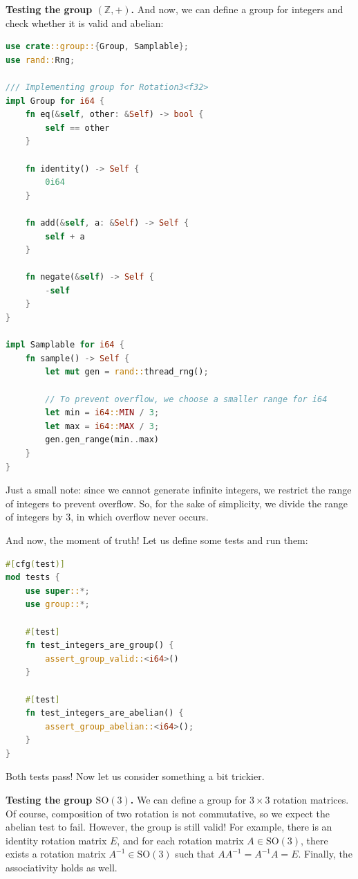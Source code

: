 \documentclass[../lecture-notes.tex]{subfiles}
\begin{document}
\textbf{Testing the group $(\mathbb{Z}, +)$.} And now, we can define a group for integers and check whether it is valid and abelian:
\begin{lstlisting}[language=Rust]
use crate::group::{Group, Samplable};
use rand::Rng;

/// Implementing group for Rotation3<f32>
impl Group for i64 {
    fn eq(&self, other: &Self) -> bool {
        self == other
    }

    fn identity() -> Self {
        0i64
    }

    fn add(&self, a: &Self) -> Self {
        self + a
    }

    fn negate(&self) -> Self {
        -self
    }
}

impl Samplable for i64 {
    fn sample() -> Self {
        let mut gen = rand::thread_rng();

        // To prevent overflow, we choose a smaller range for i64
        let min = i64::MIN / 3; 
        let max = i64::MAX / 3;
        gen.gen_range(min..max)
    }
}
\end{lstlisting}

Just a small note: since we cannot generate infinite integers, we restrict the range of integers to prevent overflow. So, 
for the sake of simplicity, we divide the range of integers by $3$, in which overflow never occurs.

And now, the moment of truth! Let us define some tests and run them:
\begin{lstlisting}[language=Rust]
#[cfg(test)]
mod tests {
    use super::*;
    use group::*;

    #[test]
    fn test_integers_are_group() {
        assert_group_valid::<i64>()
    }

    #[test]
    fn test_integers_are_abelian() {
        assert_group_abelian::<i64>();
    }
}
\end{lstlisting}

Both tests pass! Now let us consider something a bit trickier.

\textbf{Testing the group $\text{SO}(3)$.} We can define a group for $3 \times 3$ rotation matrices. Of course, composition of two rotation is not commutative, so we expect the abelian test to fail. However,
the group is still valid! For example, there is an identity rotation matrix $E$, and for each rotation matrix $A \in \text{SO}(3)$, there exists a rotation matrix $A^{-1} \in \text{SO}(3)$ such that $AA^{-1} = A^{-1}A = E$. Finally,
the associativity holds as well.
\end{document}
